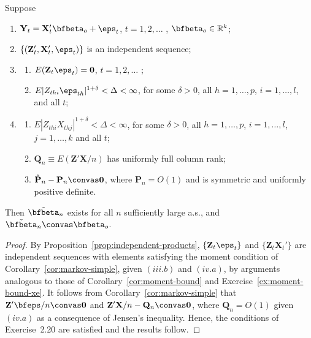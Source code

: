 \begin{theorem}\label{thm:iv-ind-het}
Suppose
\begin{enumerate}[label=(\roman*)]
\item $\mathbf{Y}_t = \mathbf{X}_t' \bfbeta_o + \eps_t$, \quad $t = 1, 2, \ldots$ , $\bfbeta_o \in \mathbb{R}^k$;
\item $\{(\mathbf{Z}_t', \mathbf{X}_t', \eps_t)\}$ is an independent sequence;
\item \begin{enumerate}[label=(\alph*)]
\item $E(\mathbf{Z}_t \eps_t) = \mathbf{0}$, \quad $t = 1, 2, \ldots$ ;
\item $E|Z_{thi} \eps_{th}|^{1+\delta} < \Delta < \infty$, for some $\delta > 0$, all $h = 1, \ldots, p$, $i = 1, \ldots, l$, and all $t$;
\end{enumerate}
\item \begin{enumerate}[label=(\alph*)]
\item $E|Z_{thi} X_{thj}|^{1+\delta} < \Delta < \infty$, for some $\delta > 0$, all $h = 1, \ldots, p$, $i = 1, \ldots, l$, $j = 1, \ldots, k$ and all $t$;
\item $\mathbf{Q}_n \equiv E(\mathbf{Z}'\mathbf{X}/n)$ has uniformly full column rank;
\item $\hat{\mathbf{P}}_n - \mathbf{P}_n \convas \mathbf{0}$, where $\mathbf{P}_n = O(1)$ and is symmetric and uniformly positive definite.
\end{enumerate}
\end{enumerate}
Then $\tilde{\bfbeta}_n$ exists for all $n$ sufficiently large a.s., and $\tilde{\bfbeta}_n \convas \bfbeta_o$.
\end{theorem}

\begin{proof}
By Proposition~\ref{prop:independent-products}, $\{\mathbf{Z}_t \eps_t\}$ and $\{\mathbf{Z}_t \mathbf{X}_t'\}$ are independent sequences with elements satisfying the moment condition of Corollary~\ref{cor:markov-simple}, given $(iii.b)$ and $(iv.a)$, by arguments analogous to those of Corollary~\ref{cor:moment-bound} and Exercise~\ref{ex:moment-bound-xe}. It follows from Corollary~\ref{cor:markov-simple} that $\mathbf{Z}'\bfeps/n \convas \mathbf{0}$ and $\mathbf{Z}'\mathbf{X}/n - \mathbf{Q}_n \convas \mathbf{0}$, where $\mathbf{Q}_n = O(1)$ given $(iv.a)$ as a consequence of Jensen's inequality. Hence, the conditions of Exercise~2.20 are satisfied and the results follow. \qedhere
\end{proof}

